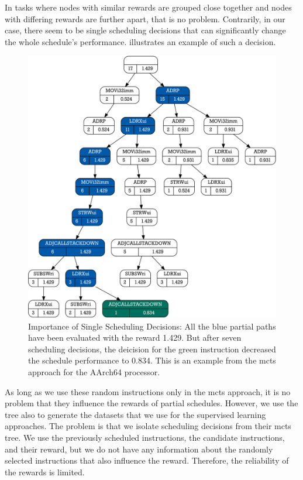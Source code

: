 In tasks where nodes with similar rewards are grouped close together and nodes with differing rewards are further apart, that is no problem.
Contrarily, in our case, there seem to be single scheduling decisions that can significantly change the whole schedule's performance.
 illustrates an example of such a decision.
\begin{figure}
    \includegraphics[width=\textwidth]{img/mcts-scores/2.inkscape-crop.pdf}
    \caption[Importance of Single Scheduling Decisions]{Importance of Single Scheduling Decisions: All the blue partial paths have been evaluated with the reward 1.429. 
    But after seven scheduling decisions, the deicision for the green instruction decreased the schedule performance to 0.834.
    This is an example from the \ac{mcts} approach for the AArch64 processor.}
    \label{fig:eval:changing-performance}
\end{figure}

As long as we use these random instructions only in the \ac{mcts} approach, it is no problem that they influence the rewards of partial schedules.
However, we use the tree also to generate the datasets that we use for the supervised learning approaches.
The problem is that we isolate scheduling decisions from their \ac{mcts} tree.
We use the previously scheduled instructions, the candidate instructions, and their reward, but we do not have any information about the randomly selected instructions that also influence the reward.
Therefore, the reliability of the rewards is limited.

